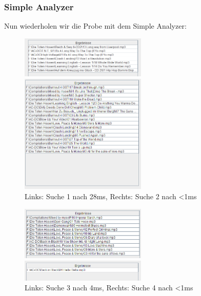 \documentclass[12pt,a4paper,ngerman]{report}
\begin{document}
\subsubsection*{Simple Analyzer}
Nun wiederholen wir die Probe mit dem Simple Analyzer:
\begin{figure}[h!]
\centering
	\begin{minipage}[b]{7cm}
	\includegraphics[width=6cm]{img/search1_simAn_28.png}
	\end{minipage}
	\begin{minipage}[b]{7cm}
	\includegraphics[width=6cm]{img/search2_simAn_0.png}
	\end{minipage}
\caption{Links: Suche 1 nach 28ms, Rechts: Suche 2 nach \textless 1ms\protect\footnotemark}
\end{figure}
\begin{figure}[h!]
\centering
	\begin{minipage}[b]{7cm}
	\includegraphics[width=6cm]{img/search3_simAn_4.png}
	\end{minipage}
	\begin{minipage}[b]{7cm}
	\includegraphics[width=6cm]{img/search4_simAn_0.png}
	\end{minipage}
\caption{Links: Suche 3 nach 4ms, Rechts: Suche 4 nach \textless 1ms\protect\footnotemark}
\end{figure}
\end{document}
